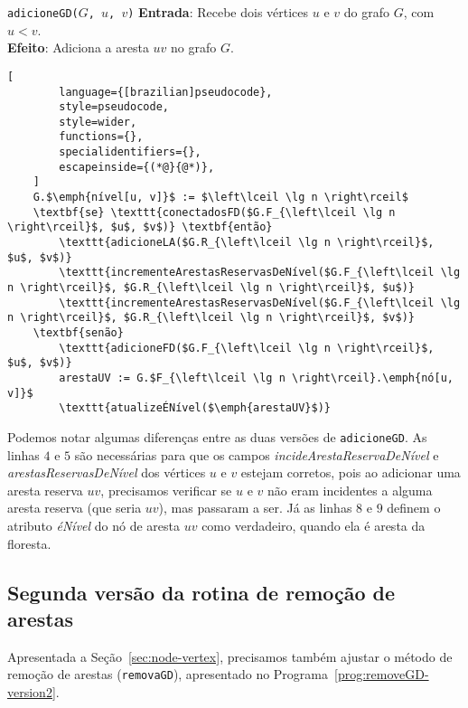 \begin{programruledcaption}{\texttt{adicioneGD($G$, $u$, $v$)} \label{prog:addGD-version2}}
    \noindent\textbf{Entrada}: Recebe dois vértices $u$ e $v$ do grafo $G$, com $u < v$. \\
    \textbf{Efeito}: Adiciona a aresta $uv$ no grafo $G$.
    \vspace{-0.5\baselineskip}
    \begin{lstlisting}[
        language={[brazilian]pseudocode},
        style=pseudocode,
        style=wider,
        functions={},
        specialidentifiers={},
        escapeinside={(*@}{@*)},
    ]
    G.$\emph{nível[u, v]}$ := $\left\lceil \lg n \right\rceil$
    \textbf{se} \texttt{conectadosFD($G.F_{\left\lceil \lg n \right\rceil}$, $u$, $v$)} \textbf{então}
        \texttt{adicioneLA($G.R_{\left\lceil \lg n \right\rceil}$, $u$, $v$)}
        \texttt{incrementeArestasReservasDeNível($G.F_{\left\lceil \lg n \right\rceil}$, $G.R_{\left\lceil \lg n \right\rceil}$, $u$)}
        \texttt{incrementeArestasReservasDeNível($G.F_{\left\lceil \lg n \right\rceil}$, $G.R_{\left\lceil \lg n \right\rceil}$, $v$)}
    \textbf{senão}
        \texttt{adicioneFD($G.F_{\left\lceil \lg n \right\rceil}$, $u$, $v$)}
        arestaUV := G.$F_{\left\lceil \lg n \right\rceil}.\emph{nó[u, v]}$
        \texttt{atualizeÉNível($\emph{arestaUV}$)}
    \end{lstlisting}
    \vspace{-0.5\baselineskip}
\end{programruledcaption}

Podemos notar algumas diferenças entre as duas versões de \texttt{adicioneGD}. As linhas $4$ e $5$ são necessárias para que os campos \textit {incideArestaReservaDeNível} e \textit{arestasReservasDeNível} dos vértices $u$ e $v$ estejam corretos, pois ao adicionar uma aresta reserva $uv$, precisamos verificar se $u$ e $v$ não eram incidentes a alguma aresta reserva (que seria $uv$), mas passaram a ser. Já as linhas $8$ e $9$ definem o atributo \textit{éNível} do nó de aresta $uv$ como verdadeiro, quando ela é aresta da floresta. 

\subsection{Segunda versão da rotina de remoção de arestas}
\label{sec:code-edge-removal-second-version}

Apresentada a Seção~\ref{sec:node-vertex}, precisamos também ajustar o método de remoção de arestas (\texttt{removaGD}), apresentado no Programa~\ref{prog:removeGD-version2}. 

